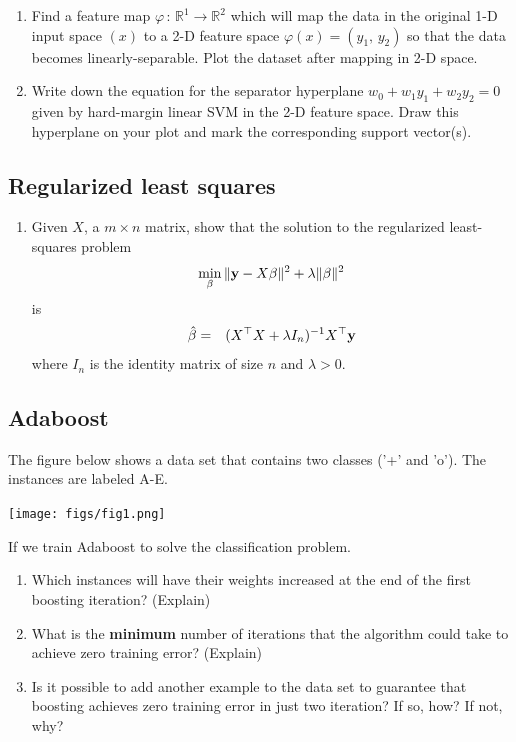 \begin{enumerate}
    \item Find a feature map $\varphi \, : \, \mathbb{R}^1 \rightarrow \mathbb{R}^2$ which will map the data in the original 1-D input space $(x)$ to a 2-D feature space $\varphi(x) = (y_1, \, y_2)$ so that the data becomes linearly-separable. Plot the dataset after mapping in 2-D space.
    
    \item Write down the equation for the separator hyperplane $w_0+w_1y_1+w_2y_2 = 0$ given by hard-margin linear SVM in the 2-D feature space. Draw this hyperplane on your plot and mark the corresponding support vector(s).

\end{enumerate}

\subsection{Regularized least squares}

\begin{enumerate}
    \item[] Given $X$, a $m \times n$ matrix, show that the solution to the regularized least-squares problem
\begin{eqnarray}
\min_{\beta} \| {\bf y} - X\beta \|^2 + \lambda \| \beta \|^2
\end{eqnarray}
is
\begin{eqnarray}
\hat{\beta} & = & (X^\top X + \lambda I_n )^{-1} X^\top {\bf y}
\end{eqnarray}
where $I_n$ is the identity matrix of size $n$ and $\lambda>0$.
\end{enumerate}



\iffalse
\newpage
\subsection{Adaboost}

The figure below shows a data set that contains two classes ('+' and 'o'). The instances are labeled A-E.

\begin{center}
\texttt{[image: figs/fig1.png]}
\end{center}

If we train Adaboost to solve the classification problem.

\begin{enumerate}
    \item Which instances will have their weights increased at the end of the first boosting iteration? (Explain)
    \item What is the \textbf{minimum} number of iterations that the algorithm could take to achieve zero training error? (Explain)
    \item Is it possible to add another example to the data set to guarantee that boosting achieves zero training error in just two iteration? If so, how? If not, why?
\end{enumerate}

